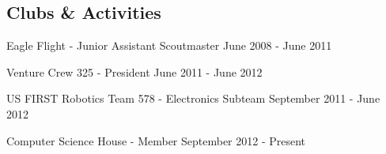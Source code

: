 \documentclass[letterpaper,margin,line,11pt]{resume}
\begin{document}
\begin{resume}
\section{\mysidestyle Clubs \& Activities}
	\begin{asparablank}
		\item Eagle Flight - {\small Junior Assistant Scoutmaster} \hfill June 2008 - June 2011
		\item Venture Crew 325 - {\small President} \hfill June 2011 - June 2012
		\item US FIRST Robotics Team 578 - {\small Electronics Subteam} \hfill September 2011 - June 2012
		\item Computer Science House - Member \hfill September 2012 - Present
	\end{asparablank}
\end{resume}
\end{document}
